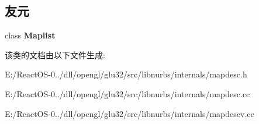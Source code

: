 \subsection*{友元}
\begin{DoxyCompactItemize}
\item 
\mbox{\label{class_mapdesc_afd6610f9064a249e3d81409029fef154}} 
class {\bfseries Maplist}
\end{DoxyCompactItemize}


该类的文档由以下文件生成\+:\begin{DoxyCompactItemize}
\item 
E\+:/\+React\+O\+S-\/0../dll/opengl/glu32/src/libnurbs/internals/mapdesc.\+h\item 
E\+:/\+React\+O\+S-\/0../dll/opengl/glu32/src/libnurbs/internals/mapdesc.\+cc\item 
E\+:/\+React\+O\+S-\/0../dll/opengl/glu32/src/libnurbs/internals/mapdescv.\+cc\end{DoxyCompactItemize}
